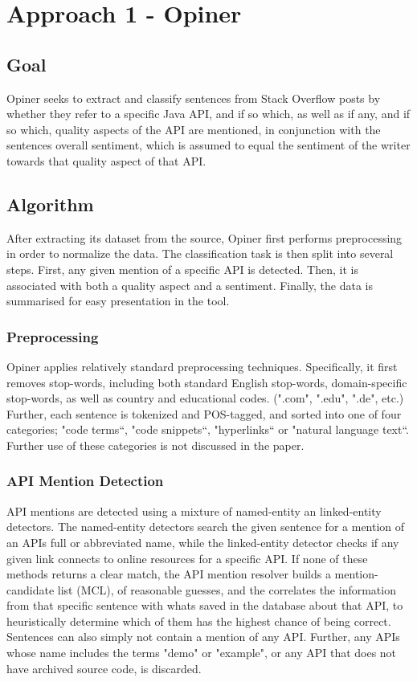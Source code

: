 \documentclass[a4paper,10pt, bibliography=totocnumbered]{scrreprt}
\begin{document}
\chapter{Approach 1 - Opiner}

\section{Goal}

Opiner \cite{OPINER} seeks to extract and classify sentences from Stack Overflow posts by whether they refer to a specific Java API, and if so which, as well as if any, and if so which, quality aspects of the API are mentioned, in conjunction with the sentences overall sentiment, which is assumed to equal the sentiment of the writer towards that quality aspect of that API.

\section{Algorithm}

After extracting its dataset from the source, Opiner first performs preprocessing in order to normalize the data. The classification task is then split into several steps. First, any given mention of a specific API is detected. Then, it is associated with both a quality aspect and a sentiment. Finally, the data is summarised for easy presentation in the tool.

\subsection{Preprocessing}

Opiner applies relatively standard preprocessing techniques. Specifically, it first removes stop-words, including both standard English stop-words, domain-specific stop-words, as well as country and educational codes. (".com", ".edu", ".de", etc.) Further, each sentence is tokenized and POS-tagged, and sorted into one of four categories; "code terms“, "code snippets“, "hyperlinks“ or "natural language text“. Further use of these categories is not discussed in the paper. 

\subsection{API Mention Detection}

API mentions are detected using a mixture of named-entity an linked-entity detectors. The named-entity detectors search the given sentence for a mention of an APIs full or abbreviated name, while the linked-entity detector checks if any given link connects to online resources for a specific API. If none of these methods returns a clear match, the API mention resolver builds a mention-candidate list (MCL), of reasonable guesses, and the correlates the information from that specific sentence with whats saved in the database about that API, to heuristically determine which of them has the highest chance of being correct. Sentences can also simply not contain a mention of any API. Further, any APIs whose name includes the terms "demo" or "example", or any API that does not have archived source code, is discarded.
\end{document}
